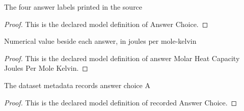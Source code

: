 \begin{definition}
  \label{def:physics:phyx-mini-0379:phyxminiproblems-problemphyxmini0379-answerchoice}
  The four answer labels printed in the source
\end{definition}
\begin{proof}
  This is the declared model definition of Answer Choice.
\end{proof}
\begin{definition}
  \label{def:physics:phyx-mini-0379:phyxminiproblems-problemphyxmini0379-answermolarheatcapacityjoulespermolekelvin}
  Numerical value beside each answer, in joules per mole-kelvin
\end{definition}
\begin{proof}
  This is the declared model definition of answer Molar Heat Capacity Joules Per Mole Kelvin.
\end{proof}
\begin{definition}
  \label{def:physics:phyx-mini-0379:phyxminiproblems-problemphyxmini0379-recordedanswerchoice}
  The dataset metadata records answer choice A
\end{definition}
\begin{proof}
  This is the declared model definition of recorded Answer Choice.
\end{proof}
